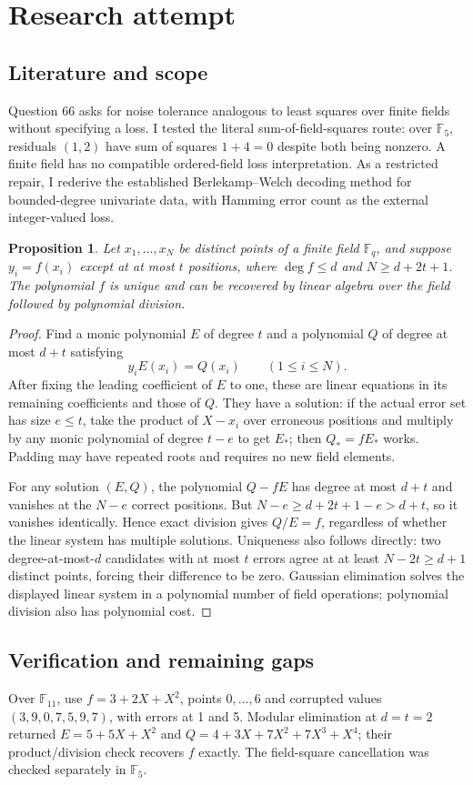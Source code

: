 \documentclass[11pt]{article}
\newtheorem{proposition}{Proposition}
\begin{document}
\section{Research attempt}
\subsection{Literature and scope}
Question 66 asks for noise tolerance analogous to least squares over finite fields without specifying a loss. I tested the literal sum-of-field-squares route: over $\mathbb F_5$, residuals $(1,2)$ have sum of squares $1+4=0$ despite both being nonzero. A finite field has no compatible ordered-field loss interpretation. As a restricted repair, I rederive the established Berlekamp--Welch decoding method for bounded-degree univariate data, with Hamming error count as the external integer-valued loss.
\begin{proposition}
Let $x_1,\ldots,x_N$ be distinct points of a finite field $\mathbb F_q$, and suppose $y_i=f(x_i)$ except at at most $t$ positions, where $\deg f\le d$ and $N\ge d+2t+1$. The polynomial $f$ is unique and can be recovered by linear algebra over the field followed by polynomial division.
\end{proposition}
\begin{proof}
Find a monic polynomial $E$ of degree $t$ and a polynomial $Q$ of degree at most $d+t$ satisfying
\[
y_iE(x_i)=Q(x_i)\qquad(1\le i\le N).
\]
After fixing the leading coefficient of $E$ to one, these are linear equations in its remaining coefficients and those of $Q$. They have a solution: if the actual error set has size $e\le t$, take the product of $X-x_i$ over erroneous positions and multiply by any monic polynomial of degree $t-e$ to get $E_*$; then $Q_*=fE_*$ works. Padding may have repeated roots and requires no new field elements.

For any solution $(E,Q)$, the polynomial $Q-fE$ has degree at most $d+t$ and vanishes at the $N-e$ correct positions. But $N-e\ge d+2t+1-e>d+t$, so it vanishes identically. Hence exact division gives $Q/E=f$, regardless of whether the linear system has multiple solutions. Uniqueness also follows directly: two degree-at-most-$d$ candidates with at most $t$ errors agree at at least $N-2t\ge d+1$ distinct points, forcing their difference to be zero. Gaussian elimination solves the displayed linear system in a polynomial number of field operations; polynomial division also has polynomial cost.
\end{proof}
\subsection{Verification and remaining gaps}
Over $\mathbb F_{11}$, use $f=3+2X+X^2$, points $0,\ldots,6$ and corrupted values $(3,9,0,7,5,9,7)$, with errors at 1 and 5. Modular elimination at $d=t=2$ returned $E=5+5X+X^2$ and $Q=4+3X+7X^2+7X^3+X^4$; their product/division check recovers $f$ exactly. The field-square cancellation was checked separately in $\mathbb F_5$.
\end{document}
